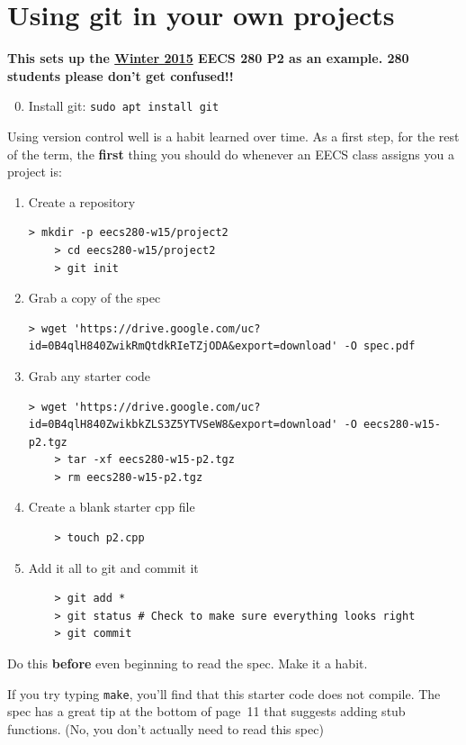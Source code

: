 \documentclass{article}
\begin{document}
\newpage
\section{Using git in your own projects}
\textbf{\color{red} This sets up the \ul{Winter 2015} EECS 280 P2 as
an example. 280 students please don't get confused!!}
\begin{enumerate}
    \setcounter{enumi}{-1}
  \item Install git: \texttt{sudo apt install git}
\end{enumerate}
\noindent
Using version control well is a habit learned over time. As a first step, for
the rest of the term, the \textbf{first} thing you should do whenever an EECS
class assigns you a project is:
\begin{enumerate}
  \item Create a repository
    \begin{Verbatim}[fontsize=\footnotesize]
    > mkdir -p eecs280-w15/project2
    > cd eecs280-w15/project2
    > git init
    \end{Verbatim}
  \item Grab a copy of the spec
    \begin{Verbatim}[fontsize=\footnotesize]
    > wget 'https://drive.google.com/uc?id=0B4qlH840ZwikRmQtdkRIeTZjODA&export=download' -O spec.pdf
    \end{Verbatim}
  \item Grab any starter code
    \begin{Verbatim}[fontsize=\footnotesize]
    > wget 'https://drive.google.com/uc?id=0B4qlH840ZwikbkZLS3Z5YTVSeW8&export=download' -O eecs280-w15-p2.tgz
    > tar -xf eecs280-w15-p2.tgz
    > rm eecs280-w15-p2.tgz
    \end{Verbatim}
  \item Create a blank starter cpp file
    \begin{lstlisting}
    > touch p2.cpp
    \end{lstlisting}
  \item Add it all to git and commit it
    \begin{lstlisting}
    > git add *
    > git status # Check to make sure everything looks right
    > git commit
    \end{lstlisting}
\end{enumerate}
Do this \textbf{before} even beginning to read the spec. Make it a habit.

\medskip
\noindent
If you try typing \texttt{make}, you'll find that this starter code does not
compile. The spec has a great tip at the bottom of page~11 that suggests
adding stub functions. {\small (No, you don't actually need to read this spec)}
\end{document}
